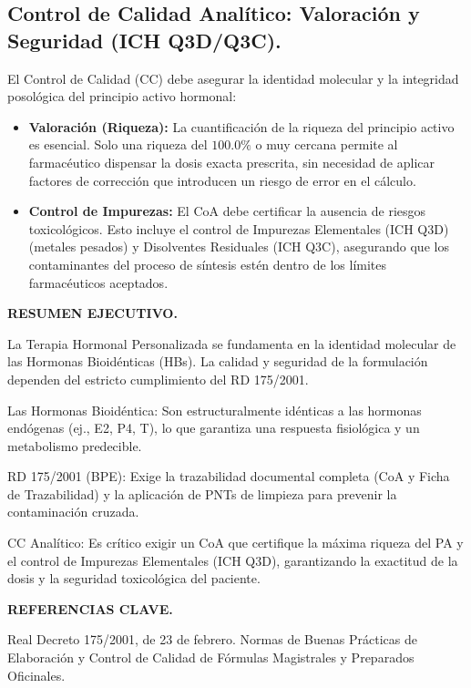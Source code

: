 \documentclass[
  spanish,
]{article}
\providecommand{\tightlist}{%
  \setlength{\itemsep}{0pt}\setlength{\parskip}{0pt}}
\begin{document}
\subsection{Control de Calidad Analítico: Valoración y Seguridad (ICH Q3D/Q3C).}\label{control-de-calidad-analuxedtico-valoraciuxf3n-y-seguridad-ich-q3dq3c.}

El Control de Calidad (CC) debe asegurar la identidad molecular y la integridad posológica del principio activo hormonal:

\begin{itemize}
\tightlist
\item
  \textbf{Valoración (Riqueza):} La cuantificación de la riqueza del principio activo es esencial. Solo una riqueza del \(\mathbf{100.0\%}\) o muy cercana permite al farmacéutico dispensar la dosis exacta prescrita, sin necesidad de aplicar factores de corrección que introducen un riesgo de error en el cálculo.
\item
  \textbf{Control de Impurezas:} El CoA debe certificar la ausencia de riesgos toxicológicos. Esto incluye el control de Impurezas Elementales (ICH Q3D) (metales pesados) y Disolventes Residuales (ICH Q3C), asegurando que los contaminantes del proceso de síntesis estén dentro de los límites farmacéuticos aceptados.
\end{itemize}

\textbf{RESUMEN EJECUTIVO.}

La Terapia Hormonal Personalizada se fundamenta en la identidad molecular de las Hormonas Bioidénticas (HBs). La calidad y seguridad de la formulación dependen del estricto cumplimiento del RD 175/2001.

Las Hormonas Bioidéntica: Son estructuralmente idénticas a las hormonas endógenas (ej., E2, P4, T), lo que garantiza una respuesta fisiológica y un metabolismo predecible.

RD 175/2001 (BPE): Exige la trazabilidad documental completa (CoA y Ficha de Trazabilidad) y la aplicación de PNTs de limpieza para prevenir la contaminación cruzada.

CC Analítico: Es crítico exigir un CoA que certifique la máxima riqueza del PA y el control de Impurezas Elementales (ICH Q3D), garantizando la exactitud de la dosis y la seguridad toxicológica del paciente.

\textbf{REFERENCIAS CLAVE.}

Real Decreto 175/2001, de 23 de febrero. Normas de Buenas Prácticas de Elaboración y Control de Calidad de Fórmulas Magistrales y Preparados Oficinales.
\end{document}
